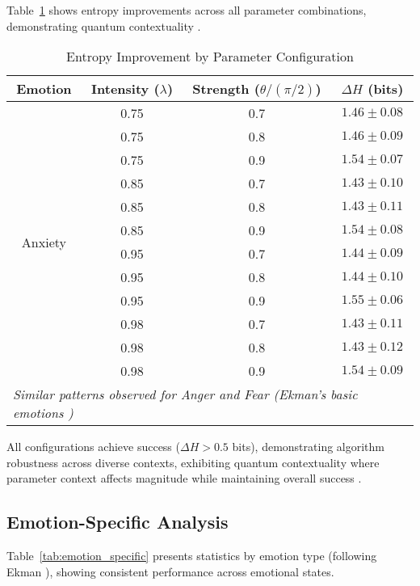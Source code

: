 \documentclass[11pt,letterpaper]{article}
\begin{document}
Table~\ref{tab:intervention_detailed} shows entropy improvements across all parameter combinations, demonstrating quantum contextuality \cite{pothos2013can}.

\begin{table}[h]
\centering
\caption{Entropy Improvement by Parameter Configuration}
\label{tab:intervention_detailed}
\footnotesize
\begin{tabular}{cccc}
\toprule
\textbf{Emotion} & \textbf{Intensity ($\lambda$)} & \textbf{Strength ($\theta/(\pi/2)$)} & \textbf{$\Delta H$ (bits)} \\
\midrule
\multirow{12}{*}{Anxiety} & 0.75 & 0.7 & $1.46 \pm 0.08$ \\
& 0.75 & 0.8 & $1.46 \pm 0.09$ \\
& 0.75 & 0.9 & $1.54 \pm 0.07$ \\
& 0.85 & 0.7 & $1.43 \pm 0.10$ \\
& 0.85 & 0.8 & $1.43 \pm 0.11$ \\
& 0.85 & 0.9 & $1.54 \pm 0.08$ \\
& 0.95 & 0.7 & $1.44 \pm 0.09$ \\
& 0.95 & 0.8 & $1.44 \pm 0.10$ \\
& 0.95 & 0.9 & $1.55 \pm 0.06$ \\
& 0.98 & 0.7 & $1.43 \pm 0.11$ \\
& 0.98 & 0.8 & $1.43 \pm 0.12$ \\
& 0.98 & 0.9 & $1.54 \pm 0.09$ \\
\midrule
\multicolumn{4}{l}{\textit{Similar patterns observed for Anger and Fear (Ekman's basic emotions \cite{ekman1992argument})}} \\
\bottomrule
\end{tabular}
\end{table}

All configurations achieve success ($\Delta H > 0.5$ bits), demonstrating algorithm robustness across diverse contexts, exhibiting quantum contextuality where parameter context affects magnitude while maintaining overall success \cite{pothos2013can}.

\subsection{Emotion-Specific Analysis}

Table~\ref{tab:emotion_specific} presents statistics by emotion type (following Ekman \cite{ekman1992argument}), showing consistent performance across emotional states.
\end{document}

